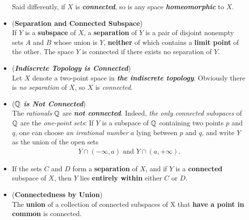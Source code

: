 \documentclass[11pt]{article}
\begin{document}
\begin{itemize}
\begin{remark}
Said differently, if $X$ is \emph{\textbf{connected}}, so is any space \emph{\textbf{homeomorphic}} to $X$.
\end{remark}

\item \begin{lemma}(\textbf{Separation and Connected Subspace}) \citep{munkres2000topology}\\
If $Y$ is a \textbf{subspace} of $X$, a \textbf{separation} of $Y$ is a pair of disjoint nonempty sets $A$ and $B$ whose union is $Y$, \textbf{neither} of which contains a \textbf{limit point} of the other. The space $Y$ is connected if there exists no separation of $Y$.
\end{lemma}

\item \begin{example} (\emph{\textbf{Indiscrete Topology is Connected}})\\
Let $X$ denote a two-point space in \emph{\textbf{the indiscrete topology}}. Obviously there is \emph{no separation} of $X$, so $X$ is \emph{connected}.
\end{example}

\item \begin{example} (\emph{\textbf{${\mathbb Q}$ is Not Connected}})\\
The \emph{rationals} ${\mathbb Q}$ are \emph{\textbf{not connected}}. Indeed, \emph{the only connected subspaces} of ${\mathbb Q}$ are the \emph{one-point sets}: If $Y$ is a subspace of ${\mathbb Q}$ containing two points $p$ and $q$, one can choose \emph{an irrational number} $a$ lying between $p$ and $q$, and write $Y$ as the union of the open
sets
\begin{align*}
Y \cap (-\infty, a)\text{ and }Y \cap (a, +\infty).
\end{align*}
\end{example}

\item \begin{lemma}
If the sets $C$ and $D$ form a \textbf{separation} of $X$, and if $Y$ is a \textbf{connected} subspace of $X$, then $Y$ lies \textbf{entirely within} either $C$ or $D$.
\end{lemma}

\item \begin{proposition} (\textbf{Connectedness by Union}) \citep{munkres2000topology}\\
The \textbf{union} of a collection of connected subspaces of X that \textbf{have a point in common} is connected.
\end{proposition}


\end{itemize}
\end{document}
